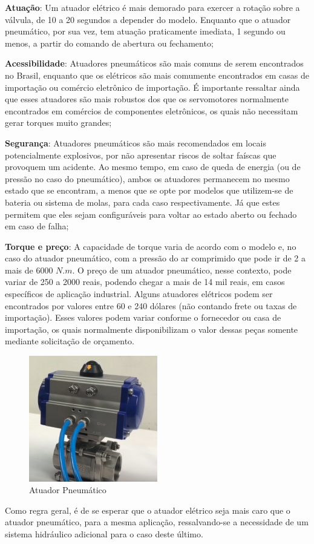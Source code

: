 \par \textbf{Atuação}: Um atuador elétrico é mais demorado para exercer a rotação sobre a válvula, de 10 a 20 segundos a depender do modelo. Enquanto que o atuador pneumático, por sua vez, tem atuação praticamente imediata, 1 segundo ou menos, a partir do comando de abertura ou fechamento;

\par \textbf{Acessibilidade}: Atuadores pneumáticos são mais comuns de serem encontrados no Brasil, enquanto que os elétricos são mais comumente encontrados em casas de importação ou comércio eletrônico de importação. É importante ressaltar ainda que esses atuadores são mais robustos dos que os servomotores normalmente encontrados em comércios de componentes eletrônicos, os quais não necessitam gerar torques muito grandes;

\par \textbf{Segurança}: Atuadores pneumáticos são mais recomendados em locais potencialmente explosivos, por não apresentar riscos de soltar faíscas que provoquem um acidente. Ao mesmo tempo, em caso de queda de energia (ou de pressão no caso do pneumático), ambos os atuadores permanecem no mesmo estado que se encontram, a menos que se opte por modelos que utilizem-se de bateria ou sistema de molas, para cada caso respectivamente. Já que estes permitem que eles sejam configuráveis para voltar ao estado aberto ou fechado em caso de falha;

\par \textbf{Torque e preço}: A capacidade de torque varia de acordo com o modelo e, no caso do atuador pneumático, com a pressão do ar comprimido que pode ir de 2 a mais de 6000 $N.m$. O preço de um atuador pneumático, nesse contexto, pode variar de 250 a 2000 reais, podendo chegar a mais de 14 mil reais, em casos específicos de aplicação industrial. Alguns atuadores elétricos podem ser encontrados por valores entre 60 e 240 dólares (não contando frete ou taxas de importação). Esses valores podem variar conforme o fornecedor ou casa de importação, os quais normalmente disponibilizam o valor dessas peças somente mediante solicitação de orçamento.

\begin{figure}[!h]
\centering
\includegraphics[width=0.5\textwidth]{figuras/atuadorPneumatico.png}
\caption{Atuador Pneumático}
\label{fig:atuador pneumatico}
\end{figure}

\par Como regra geral, é de se esperar que o atuador elétrico seja mais caro que o atuador pneumático, para a mesma aplicação, ressalvando-se a necessidade de um sistema hidráulico adicional para o caso deste último.

